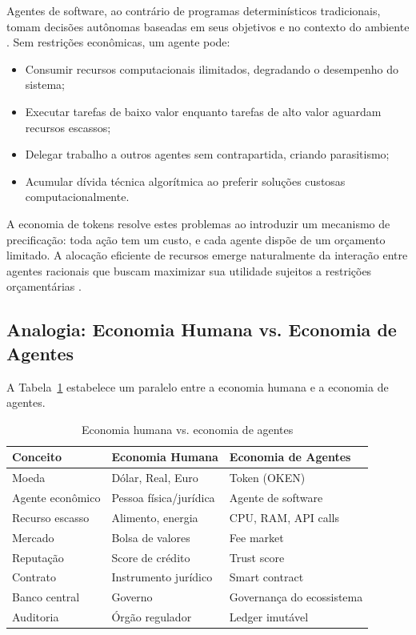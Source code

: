 Agentes de software, ao contrário de programas determinísticos
tradicionais, tomam decisões autônomas baseadas em seus objetivos
e no contexto do ambiente \cite{russell2020inteligencia,
wooldridge2009multiagent}. Sem restrições econômicas, um agente
pode:

\begin{itemize}
\item Consumir recursos computacionais ilimitados, degradando o
desempenho do sistema;
\item Executar tarefas de baixo valor enquanto tarefas de alto
valor aguardam recursos escassos;
\item Delegar trabalho a outros agentes sem contrapartida,
criando parasitismo;
\item Acumular dívida técnica algorítmica ao preferir soluções
custosas computacionalmente.
\end{itemize}

A economia de tokens resolve estes problemas ao introduzir um
mecanismo de precificação: toda ação tem um custo, e cada agente
dispõe de um orçamento limitado. A alocação eficiente de recursos
emerge naturalmente da interação entre agentes racionais que buscam
maximizar sua utilidade sujeitos a restrições orçamentárias
\cite{vonneumann1944theory, nash1950equilibrium}.

\subsection{Analogia: Economia Humana vs. Economia de Agentes}

A Tabela~\ref{tab:economia-humana-agentes} estabelece um paralelo
entre a economia humana e a economia de agentes.

\begin{table}[htb]
\centering
\caption{Economia humana vs. economia de agentes}
\label{tab:economia-humana-agentes}
\begin{tabular}{lll}
\toprule
\textbf{Conceito} & \textbf{Economia Humana} & \textbf{Economia de Agentes} \\
\midrule
Moeda & Dólar, Real, Euro & Token (OKEN) \\
Agente econômico & Pessoa física/jurídica & Agente de software \\
Recurso escasso & Alimento, energia & CPU, RAM, API calls \\
Mercado & Bolsa de valores & Fee market \\
Reputação & Score de crédito & Trust score \\
Contrato & Instrumento jurídico & Smart contract \\
Banco central & Governo & Governança do ecossistema \\
Auditoria & Órgão regulador & Ledger imutável \\
\bottomrule
\end{tabular}
\end{table}

